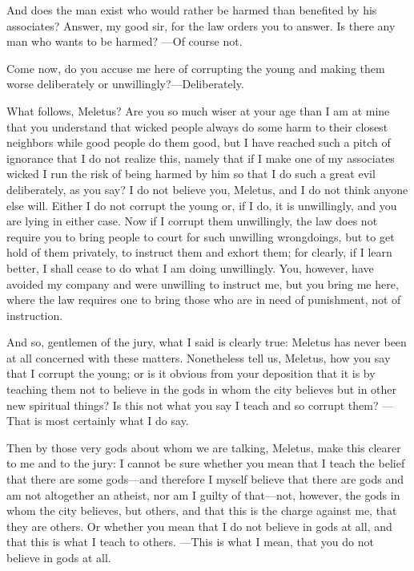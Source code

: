 And does the man exist who would rather be harmed than benefited by his associates? Answer,
my good sir, for the law orders you to answer. Is there any man who wants to be harmed? —Of
course not.

Come now, do you accuse me here of corrupting the young and making them worse
deliberately or unwillingly?—Deliberately.

What follows, Meletus? Are you so much wiser at your age than I am at mine that you
understand that wicked people always do some harm to their closest neighbors while good people
do them good, but I have reached such a pitch of ignorance that I do not realize this, namely that
if I make one of my associates wicked I run the risk of being harmed by him so that I do such a
great evil deliberately, as you say? I do not believe you, Meletus, and I do not think anyone else
will. Either I do not corrupt the young or, if I do, it is unwillingly, and you are lying in either case.
Now if I corrupt them unwillingly, the law does not require you to bring people to court for such
unwilling wrongdoings, but to get hold of them privately, to instruct them and exhort them; for
clearly, if I learn better, I shall cease to do what I am doing unwillingly. You, however, have
avoided my company and were unwilling to instruct me, but you bring me here, where the law
requires one to bring those who are in need of punishment, not of instruction.

And so, gentlemen of the jury, what I said is clearly true: Meletus has never been at all
concerned with these matters. Nonetheless tell us, Meletus, how you say that I corrupt the young;
or is it obvious from your deposition that it is by teaching them not to believe in the gods in whom
the city believes but in other new spiritual things? Is this not what you say I teach and so corrupt
them? —That is most certainly what I do say.

Then by those very gods about whom we are talking, Meletus, make this clearer to me and to
the jury: I cannot be sure whether you mean that I teach the belief that there are some gods—and
therefore I myself believe that there are gods and am not altogether an atheist, nor am I guilty of
that—not, however, the gods in whom the city believes, but others, and that this is the charge
against me, that they are others. Or whether you mean that I do not believe in gods at all, and that
this is what I teach to others. —This is what I mean, that you do not believe in gods at all.

